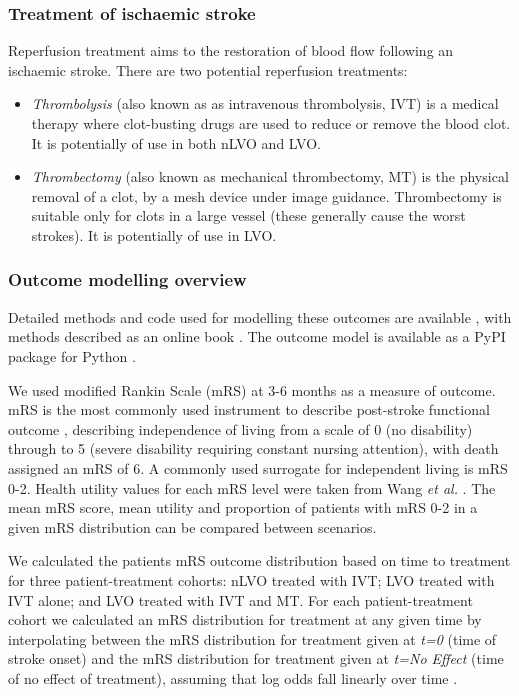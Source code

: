 \subsubsection{Treatment of ischaemic stroke}

Reperfusion treatment aims to  the restoration of blood flow following an ischaemic stroke. There are two potential reperfusion treatments:

\begin{itemize}
    \item \textit{Thrombolysis} (also known as as intravenous thrombolysis, IVT) is a medical therapy where clot-busting drugs are used to reduce or remove the blood clot. It is potentially of use in both nLVO and LVO.
    
    \item \textit{Thrombectomy} (also known as mechanical thrombectomy, MT) is the physical removal of a clot, by a mesh device under image guidance. Thrombectomy is suitable only for clots in a large vessel (these generally cause the worst strokes). It is potentially of use in LVO.
\end{itemize}


\subsubsection{Outcome modelling overview}

Detailed methods and code used for modelling these outcomes are available \cite{github2}, with methods described as an online book \cite{github3}. The outcome model is available as a PyPI package for Python \cite{pypi}.

We used modified Rankin Scale (mRS) at 3-6 months as a measure of outcome. mRS is the most commonly used instrument to describe post-stroke functional outcome \cite{quinn_functional_2009}, describing independence of living from a scale of 0 (no disability) through to 5 (severe disability requiring constant nursing attention), with death assigned an mRS of 6. A commonly used surrogate for independent living is  mRS 0-2. Health utility values for each mRS level were taken from Wang \textit{et al.} \cite{wang_utility-weighted_2020}. The mean mRS score, mean utility and proportion of patients with mRS 0-2 in a given mRS distribution can be compared between scenarios.

We calculated the patients mRS outcome distribution based on time to treatment for three patient-treatment cohorts: nLVO treated with IVT; LVO treated with IVT alone; and LVO treated with IVT and MT. For each patient-treatment cohort we calculated an mRS distribution for treatment at any given time by interpolating between the mRS distribution for treatment given at \emph{t=0} (time of stroke onset) and the mRS distribution for treatment given at \emph{t=No Effect} (time of no effect of treatment), assuming that log odds fall linearly over time \cite{emberson_effect_2014, fransen_time_2016}.

